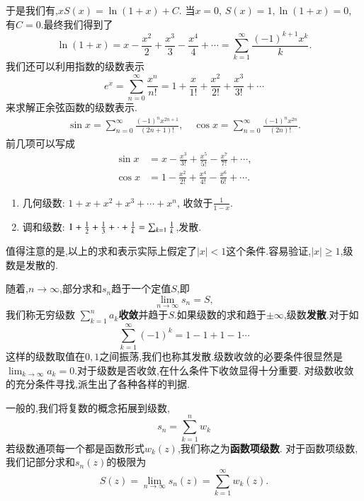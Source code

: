于是我们有,$
    x S(x) = \ln (1 + x) + C .$
当$x=0$, $S(x) = 1, \ln (1+x) = 0$, 有$C=0$.最终我们得到了
\begin{equation}
    \ln (1+x) = x -  \frac{x^2}{2} + \frac{x^3}{3} - \frac{x^4}{4} + \cdots = \sum_{k=1}^{\infty} \frac{(-1)^{k+1} x^k}{k} .
\end{equation}
我们还可以利用指数的级数表示
\begin{equation}
    e^{x} = \sum_{n=0}^{\infty} \frac{x^n}{n!} = 1 + \frac{x}{1!} + \frac{x^2}{2!} + \frac{x^3}{3!} + \cdots 
\end{equation}
来求解正余弦函数的级数表示.
\begin{align*}
  \sin x = \sum_{n=0}^{\infty} \frac{(-1)^n x^{2n+1}}{(2n+1)!}, \quad
  \cos x = \sum_{n=0}^{\infty} \frac{(-1)^n x^{2n}}{(2n)!} .
\end{align*}
前几项可以写成
\begin{align*}
  \sin x & = x - \frac{x^3}{3!} + \frac{x^5}{5!} - \frac{x^7}{7!} + \cdots , \\
  \cos x & = 1 - \frac{x^2}{2!} + \frac{x^4}{4!} - \frac{x^6}{6!} + \cdots .
\end{align*}

\begin{enumerate}
    \item 几何级数: $ 1 + x + x^2 + x^3 + \cdots + x^n$, 收敛于$\frac{1}{1-x}$.
    \item 调和级数: $ 1 + {\frac{1}{2}} + \frac{1}{3} + \cdot +\frac{1}{k} = \sum_{k=1} \frac{1}{k}$,发散.
\end{enumerate}

值得注意的是,以上的求和表示实际上假定了$|x|<1$这个条件.容易验证,$|x|\geq 1$,级数是发散的.

随着,$n\to \infty$,部分求和$s_n$趋于一个定值$S$,即
\begin{equation}
    \lim_{n\to \infty} s_n = S ,
\end{equation}
我们称无穷级数 $\sum_{k=1}^{n} a_{k}${\bf 收敛}并趋于$S$.如果级数的求和趋于$\pm \infty$,级数{\bf 发散}.对于如
\begin{equation}
    \sum_{k=1}^{\infty} (-1)^k = 1 - 1 + 1 - 1 \cdots 
\end{equation}
这样的级数取值在$0,1$之间振荡,我们也称其发散.级数收敛的必要条件很显然是$\lim_{k\to \infty} a_k = 0$.对于级数是否收敛,在什么条件下收敛显得十分重要.
对级数收敛的充分条件寻找,派生出了各种各样的判据.

一般的,我们将复数的概念拓展到级数,
\begin{equation}
    s_n = \sum_{k=1}^{n} w_{k}
\end{equation}
若级数通项每一个都是函数形式$w_k(z)$,我们称之为\textbf{函数项级数}.
对于函数项级数,我们记部分求和$s_n(z)$的极限为
\begin{equation}
    S(z) = \lim_{n\to \infty} s_n(z) =  \sum_{k=1}^{\infty} w_k (z). 
\end{equation}


